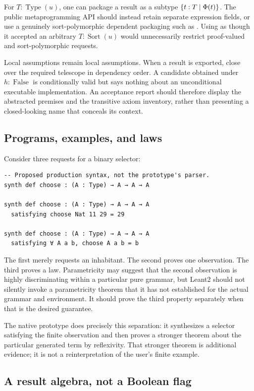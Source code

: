 For $T:\operatorname{Type}(u)$, one can package a result as a subtype $\{t:T\mid\Phi(t)\}$. The public metaprogramming API should instead retain separate expression fields, or use a genuinely sort-polymorphic dependent packaging such as . Using  as though it accepted an arbitrary $T:\operatorname{Sort}(u)$ would unnecessarily restrict proof-valued and sort-polymorphic requests.

Local assumptions remain local assumptions. When a result is exported, close over the required telescope in dependency order. A candidate obtained under $h:\operatorname{False}$ is conditionally valid but says nothing about an unconditional executable implementation. An acceptance report should therefore display the abstracted premises and the transitive axiom inventory, rather than presenting a closed-looking name that conceals its context.

\subsection{Programs, examples, and laws}

Consider three requests for a binary selector:
\begin{lstlisting}
-- Proposed production syntax, not the prototype's parser.
synth def choose : (A : Type) → A → A → A

synth def choose : (A : Type) → A → A → A
  satisfying choose Nat 11 29 = 29

synth def choose : (A : Type) → A → A → A
  satisfying ∀ A a b, choose A a b = b
\end{lstlisting}
The first merely requests an inhabitant. The second proves one observation. The third proves a law. Parametricity may suggest that the second observation is highly discriminating within a particular pure grammar, but Leant2 should not silently invoke a parametricity theorem that it has not established for the actual grammar and environment. It should prove the third property separately when that is the desired guarantee.

The native prototype does precisely this separation: it synthesizes a selector satisfying the finite observation and then proves a stronger theorem about the particular generated term by reflexivity. That stronger theorem is additional evidence; it is not a reinterpretation of the user's finite example.

\subsection{A result algebra, not a Boolean flag}

